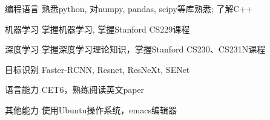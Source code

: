 

\begin{cvskills}

  \cvskill
    {编程语言} %
    {熟悉python, 对numpy, pandas, scipy等库熟悉; 了解C++} %

  \cvskill
    {机器学习} %
    {掌握机器学习, 掌握Stanford CS229课程} %

  \cvskill
    {深度学习} %
    {掌握深度学习理论知识，掌握Stanford CS230、CS231N课程} %

  \cvskill
    {目标识别} %
    {Faster-RCNN, Resnet, ResNeXt, SENet} %

  \cvskill
    {语言能力} %
    {CET6，熟练阅读英文paper} %

  \cvskill
    {其他能力} %
    {使用Ubuntu操作系统，emacs编辑器} %

\end{cvskills}
